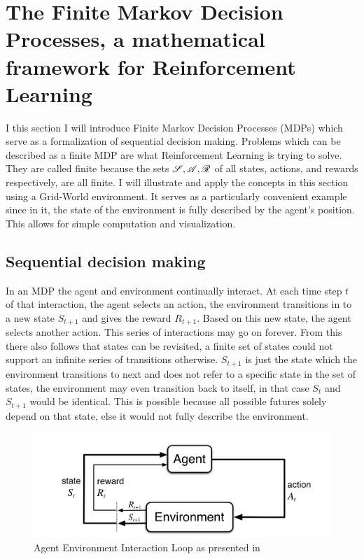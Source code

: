 \section{The Finite Markov Decision Processes, a mathematical framework for Reinforcement Learning}\label{sec:MDP} %
I this section I will introduce Finite Markov Decision Processes (MDPs) which serve as a formalization of sequential decision making. Problems which can be described as a finite MDP are what Reinforcement Learning is trying to solve. They are called finite because the sets $\mathscr{S}, \mathscr{A}, \mathscr{R}$ of all states, actions, and rewards respectively, are all finite. I will illustrate and apply the concepts in this section using a Grid-World environment. It serves as a particularly convenient example since in it, the state of the environment is fully described by the agent's position. This allows for simple computation and visualization. 

\subsection{Sequential decision making}\label{subsec:sequential_decision_making}
In an MDP the agent and environment continually interact. At each time step $t$ of that interaction, the agent selects an action, the environment transitions in to a new state $S_{t+1}$ and gives the reward $R_{t+1}$. Based on this new state, the agent selects another action. This series of interactions may go on forever. From this there also follows that states can be revisited, a finite set of states could not support an infinite series of transitions otherwise. $S_ {t+1}$ is just the state which the environment transitions to next and does not refer to a specific state in the set of states, the environment may even transition back to itself, in that case $S_t$ and $S_{t+1}$ would be identical. This is possible because all possible futures solely depend on that state, else it would not fully describe the environment.

\begin{figure}[h!]
    \centering
    \includegraphics[width=0.7\linewidth]{figures/agent_environment_interaction_loop.png}
    \caption{Agent Environment Interaction Loop as presented in }
    \label{fig:agent_env_inter}
\end{figure}

